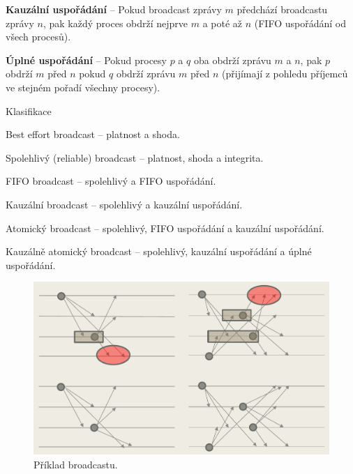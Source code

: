 \begin{compactitem}
\begin{compactitem}
        \item \textbf{Kauzální uspořádání} -- Pokud broadcast zprávy $m$ předchází broadcastu zprávy $n$, pak každý proces obdrží nejprve $m$ a poté až $n$ (FIFO uspořádání od všech procesů).

        \item \textbf{Úplné uspořádání} -- Pokud procesy $p$ a $q$ oba obdrží zprávu $m$ a $n$, pak $p$ obdrží $m$ před $n$ pokud $q$ obdrží zprávu $m$ před $n$ (přijímají z pohledu příjemců ve stejném pořadí všechny procesy).
    \end{compactitem}

    \item Klasifikace \begin{compactitem}
        \item Best effort broadcast -- platnost a shoda.
        \item Spolehlivý (reliable) broadcast -- platnost, shoda a integrita.
        \item FIFO broadcast -- spolehlivý a FIFO uspořádání.
        \item Kauzální broadcast -- spolehlivý a kauzální uspořádání.
        \item Atomický broadcast -- spolehlivý, FIFO uspořádání a kauzální uspořádání.
        \item Kauzálně atomický broadcast -- spolehlivý, kauzální uspořádání a úplné uspořádání.
    \end{compactitem}

    \begin{figure}[H]
        \centering
        \includegraphics[width=1\linewidth]{broadcast.pdf}
        \caption{Příklad broadcastu.}
    \end{figure}
\end{compactitem}
